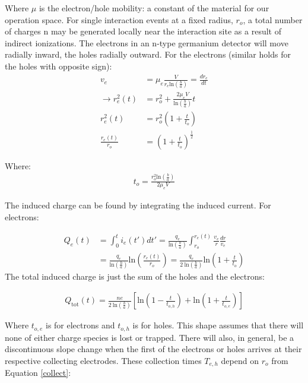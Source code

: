 Where $\mu$ is the electron/hole mobility: a constant of the material for our operation space. For single interaction events at a fixed radius, $r_{o}$, a total number of charges n may be generated locally near the interaction site as a result of indirect ionizations. The electrons in an n-type germanium detector will move radially inward, the holes radially outward. For the electrons (similar holds for the holes with opposite sign):
\begin{align}
    v_{e} &= \mu_{e} \frac{V}{r_{e}\mathrm{ln}\left(\frac{b}{a}\right)}= \frac{dr_{e}}{dt} \nonumber \\
    \rightarrow  r^{2}_{e}(t) &= r_{o}^{2} + \frac{2\mu_{e}V}{\mathrm{ln}\left(\frac{b}{a}\right)} t \\
    r_{e}^{2}(t) &= r_{o}^{2} \left(1 + \frac{t}{t_{o}} \right) \label{radius} \\
    \frac{r_{e}(t)}{r_{o}} &=\left(1 + \frac{t}{t_{o}} \right)^{\frac{1}{2}} 
\end{align}

Where:
\begin{align}
    t_{o} = \frac{r_{o}^{2} \mathrm{ln}\left(\frac{b}{a}\right)}{2 \mu_{e} V}
\end{align}

The induced charge can be found by integrating the induced current. For electrons:

\begin{align}
    Q_{e}(t) &= \int_{0}^{t}i_{e}(t')dt' = \frac{q_{e}}{\mathrm{ln}\left(\frac{b}{a}\right)}\int_{r_{o}}^{r_{e}(t)}\frac{v_{e}}{r}\frac{dr}{v_{e}}\nonumber \\
   &= \frac{q_{e}}{\mathrm{ln}\left(\frac{b}{a}\right)}\mathrm{ln}\left(\frac{r_{e}(t)}{r_{o}}\right) = \frac{q_{e}}{2\ \mathrm{ln}\left(\frac{b}{a}\right)}\mathrm{ln}\left(1 + \frac{t}{t_{o}}\right)
\end{align}
The total induced charge is just the sum of the holes and the electrons:

\begin{align} \label{induced}
     Q_{\mathrm{tot}}(t) =  \frac{ne}{2\ \mathrm{ln}\left(\frac{b}{a}\right)} \left[\mathrm{ln}\left(1 - \frac{t}{t_{o,h}}\right) + \mathrm{ln}\left(1 + \frac{t}{t_{o,e}}\right)\right]
\end{align}

Where $t_{o,e}$ is for electrons and $t_{o,h}$ is for holes. This shape assumes that there will none of either charge species is lost or trapped. There will also, in general, be a discontinuous slope change when the first of the electrons or holes arrives at their respective collecting electrodes. These collection times $T_{e,h}$ depend on $r_{o}$ from Equation \ref{collect}:

